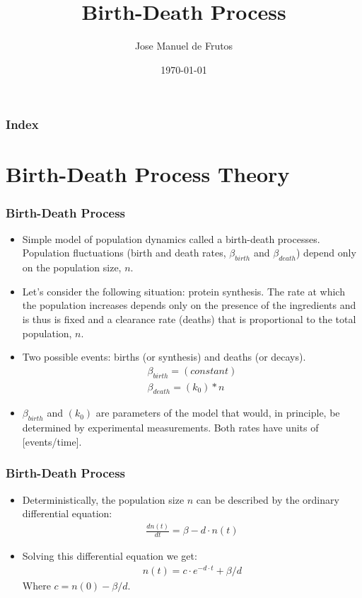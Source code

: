 \documentclass[10pt, usenames, dvipsnames, xcolor=table]{beamer}
\title[]{Birth-Death Process}
\author[Jose Manuel de Frutos]{\sc  Jose Manuel de Frutos}
\institute[]{\textbf {}}
\date{\today}
\begin{document}
\frame{\titlepage}

\begin{frame}
  \frametitle{Index}
  \tableofcontents
\end{frame}

\section{Birth-Death Process Theory}
\begin{frame}
\frametitle{Birth-Death Process}

\begin{itemize}
\item Simple model of population dynamics called a birth-death processes. Population fluctuations (birth and death rates, $\beta_{birth}$ and $\beta_{death}$) depend only on the population size, $n$.

\item Let’s consider the following situation: protein synthesis. The rate at which the population increases depends only on the presence of the ingredients and is thus is fixed and a clearance rate (deaths) that is proportional to the total population, $n$.


\item Two possible events: births (or synthesis) and deaths (or decays).
\begin{align*}
\beta_{birth} = (constant)\\
\beta_{death}  = (k_0)*n
\end{align*}
\item $\beta_{birth}$  and $(k_0)$ are parameters of the model that would, in principle, be determined by experimental measurements. Both rates have units of [events/time].
\end{itemize}
\end{frame}

\begin{frame}
\frametitle{Birth-Death Process}

\begin{itemize}
\item Deterministically, the population size $n$ can be described by the ordinary differential equation:
\begin{align*}
\frac{dn(t)}{dt} = \beta - d \cdot n(t)
\end{align*}
\item Solving this differential equation we get:
\begin{align*}
n(t) = c \cdot e^{-d\cdot t}+\beta/d
\end{align*}
Where $c=n(0)-\beta/d$.
\end{itemize}
\end{frame}
\end{document}
